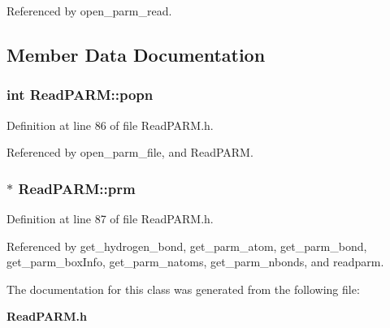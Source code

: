 Referenced by open\_\-parm\_\-read.

\subsection{Member Data Documentation}
\subsubsection{\setlength{\rightskip}{0pt plus 5cm}int Read\-PARM::popn}\label{classReadPARM_m0}




Definition at line 86 of file Read\-PARM.h.

Referenced by open\_\-parm\_\-file, and Read\-PARM.
\subsubsection{$\ast$ Read\-PARM::prm}\label{classReadPARM_m1}




Definition at line 87 of file Read\-PARM.h.

Referenced by get\_\-hydrogen\_\-bond, get\_\-parm\_\-atom, get\_\-parm\_\-bond, get\_\-parm\_\-box\-Info, get\_\-parm\_\-natoms, get\_\-parm\_\-nbonds, and readparm.

The documentation for this class was generated from the following file:\begin{CompactItemize}
\item 
{\bf Read\-PARM.h}\end{CompactItemize}
